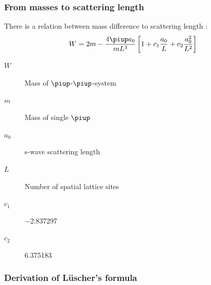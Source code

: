 \documentclass[english, fleqn]{beamer}
\begin{document}
\begin{frame}
    \frametitle{From masses to scattering length}

    There is a relation between mass difference to scattering length
    \parencite[(1.3)]{luescher/volume_dependence}:
    \[
        W = 2m - \frac{4 \piup a_0}{m L^3} \sbr{1 + c_1 \frac{a_0}L + c_2 \frac{a_0^2}{L^2}}
    \]

    \begin{description}
        \item[$W$] Mass of $\piup$-$\piup$-system
        \item[$m$] Mass of single $\piup$
        \item[$a_0$] s-wave scattering length
        \item[$L$] Number of spatial lattice sites
        \item[$c_1$] \num{-2.837297}
        \item[$c_2$] \num{6.375183}
    \end{description}
\end{frame}

\begin{frame}
    \frametitle{Derivation of Lüscher's formula}

\end{frame}
\end{document}
